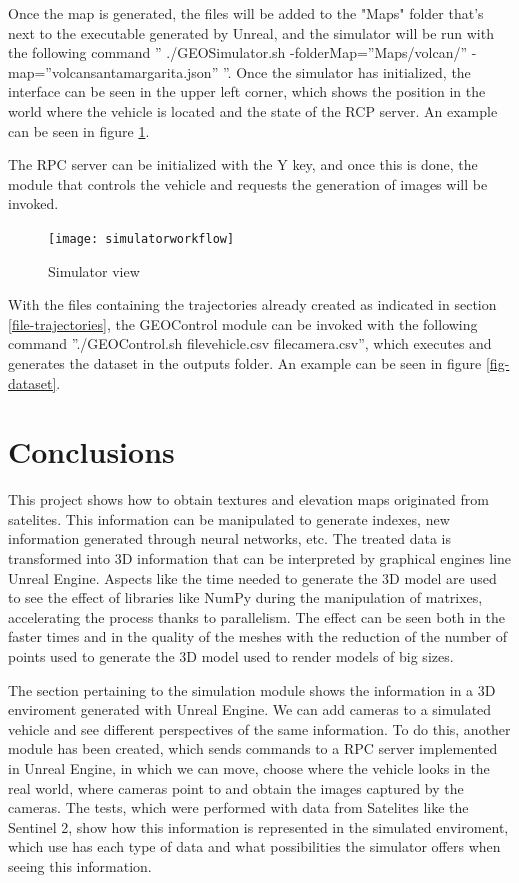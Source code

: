 \documentclass[10pt,a4paper,twocolumn,twoside]{article}
\begin{document}
Once the map is generated, the files will be added to the "Maps" folder that's next to the executable generated by Unreal, and the simulator will be run with the following command  '' ./GEOSimulator.sh -folderMap=''Maps/volcan/'' -map=''volcansantamargarita.json'' ''. Once the simulator has initialized, the interface can be seen in the upper left corner, which shows the position in the world where the vehicle is located and the state of the RCP server. An example can be seen in figure \ref{fig-workflowsimulator}.

The RPC server can be initialized with the Y key, and once this is done, the module that controls the vehicle and requests the generation of images will be invoked.

\begin{figure}[!h]
\centering
  	\texttt{[image: simulatorworkflow]}
	\caption{Simulator view}
	\label{fig-workflowsimulator}
\end{figure}

With the files containing the trajectories already created as indicated in section \ref{file-trajectories}, the GEOControl module can be invoked with the following command ''./GEOControl.sh filevehicle.csv filecamera.csv'', which executes and generates the dataset in the outputs folder. An example can be seen in figure \ref{fig-dataset}.

\section{Conclusions}

This project shows how to obtain textures and elevation maps originated from satelites. This information can be manipulated to generate indexes, new information generated through neural networks, etc. The treated data is transformed into 3D information that can be interpreted by graphical engines line Unreal Engine. Aspects like the time needed to generate the 3D model are used to see the effect of libraries like NumPy during the manipulation of matrixes, accelerating the process thanks to parallelism. The effect can be seen both in the faster times and in the quality of the meshes with the reduction of the number of points used to generate the 3D model used to render models of big sizes.

The section pertaining to the simulation module shows the information in a 3D enviroment generated with Unreal Engine. We can add cameras to a simulated vehicle and see different perspectives of the same information. To do this, another module has been created, which sends commands to a RPC server implemented in Unreal Engine, in which we can move, choose where the vehicle looks in the real world, where cameras point to and obtain the images captured by the cameras.
The tests, which were performed with data from Satelites like the Sentinel 2, show how this information is represented in the simulated enviroment, which use has each type of data and what possibilities the simulator offers when seeing this information.
\end{document}
